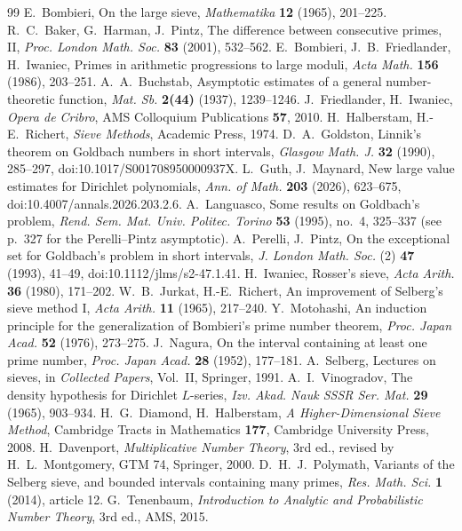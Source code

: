 \documentclass[final,11pt]{elsarticle}
\theoremstyle{definition}
\theoremstyle{remark}
\numberwithin{equation}{section}
\begin{document}
\begin{thebibliography}{99}
 E.~Bombieri, On the large sieve, \emph{Mathematika} \textbf{12} (1965), 201--225.
 R.~C.~Baker, G.~Harman, J.~Pintz, The difference between consecutive primes, II, \emph{Proc. London Math. Soc.} \textbf{83} (2001), 532--562.
 E.~Bombieri, J.~B.~Friedlander, H.~Iwaniec, Primes in arithmetic progressions to large moduli, \emph{Acta Math.} \textbf{156} (1986), 203--251.
 A.~A.~Buchstab, Asymptotic estimates of a general number-theoretic function, \emph{Mat. Sb.} \textbf{2(44)} (1937), 1239--1246.
 J.~Friedlander, H.~Iwaniec, \emph{Opera de Cribro}, AMS Colloquium Publications \textbf{57}, 2010.
 H.~Halberstam, H.-E.~Richert, \emph{Sieve Methods}, Academic Press, 1974.
 D.~A.~Goldston, Linnik's theorem on Goldbach numbers in short intervals, \emph{Glasgow Math. J.} \textbf{32} (1990), 285--297, doi:10.1017/S001708950000937X.
 L.~Guth, J.~Maynard, New large value estimates for Dirichlet polynomials, \emph{Ann. of Math.} \textbf{203} (2026), 623--675, doi:10.4007/annals.2026.203.2.6.
 A.~Languasco, Some results on Goldbach's problem, \emph{Rend. Sem. Mat. Univ. Politec. Torino} \textbf{53} (1995), no.~4, 325--337 (see p.~327 for the Perelli--Pintz asymptotic).
 A.~Perelli, J.~Pintz, On the exceptional set for Goldbach's problem in short intervals, \emph{J. London Math. Soc.} (2) \textbf{47} (1993), 41--49, doi:10.1112/jlms/s2-47.1.41.
 H.~Iwaniec, Rosser's sieve, \emph{Acta Arith.} \textbf{36} (1980), 171--202.
 W.~B.~Jurkat, H.-E.~Richert, An improvement of Selberg's sieve method I, \emph{Acta Arith.} \textbf{11} (1965), 217--240.
 Y.~Motohashi, An induction principle for the generalization of Bombieri's prime number theorem, \emph{Proc. Japan Acad.} \textbf{52} (1976), 273--275.
 J.~Nagura, On the interval containing at least one prime number, \emph{Proc. Japan Acad.} \textbf{28} (1952), 177--181.
 A.~Selberg, Lectures on sieves, in \emph{Collected Papers}, Vol.~II, Springer, 1991.
 A.~I.~Vinogradov, The density hypothesis for Dirichlet $L$-series, \emph{Izv. Akad. Nauk SSSR Ser. Mat.} \textbf{29} (1965), 903--934.
 H.~G.~Diamond, H.~Halberstam, \emph{A Higher-Dimensional Sieve Method}, Cambridge Tracts in Mathematics \textbf{177}, Cambridge University Press, 2008.
 H.~Davenport, \emph{Multiplicative Number Theory}, 3rd ed.,
revised by H.~L.~Montgomery, GTM 74, Springer, 2000.
 D.~H.~J.~Polymath, Variants of the Selberg sieve, and
bounded intervals containing many primes, \emph{Res. Math. Sci.} \textbf{1}
(2014), article 12.
 G.~Tenenbaum, \emph{Introduction to Analytic and Probabilistic
Number Theory}, 3rd ed., AMS, 2015.
\end{thebibliography}
\end{document}
